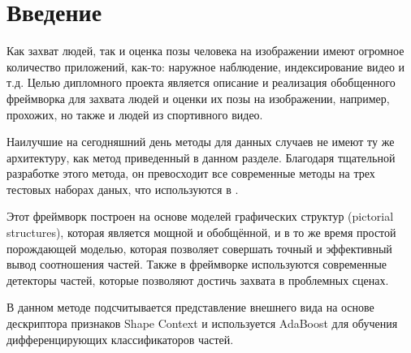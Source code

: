 \section*{Введение}
Как захват людей, так и оценка позы человека на изображении имеют огромное количество приложений, как-то: наружное наблюдение, индексирование видео и т.д. Целью дипломного проекта является описание и реализация обобщенного фреймворка для захвата людей и оценки их позы на изображении, например, прохожих, но также и людей из спортивного видео.

Наилучшие на сегодняшний день методы для данных случаев не имеют ту же архитектуру, как метод приведенный в данном разделе. Благодаря тщательной разработке этого метода, он превосходит все современные методы на трех тестовых наборах даных, что используются в \cite{andriluka09}.

Этот фреймворк построен на основе моделей графических структур (pictorial structures), которая является мощной и обобщённой, и в то же время простой порождающей моделью, которая позволяет совершать точный и эффективный вывод соотношения частей. Также в фреймворке используются современные детекторы частей, которые позволяют достичь захвата в проблемных сценах.

В данном методе подсчитывается представление внешнего вида на основе дескриптора признаков Shape Context и используется AdaBoost для обучения дифференцирующих классификаторов частей.

\newpage
